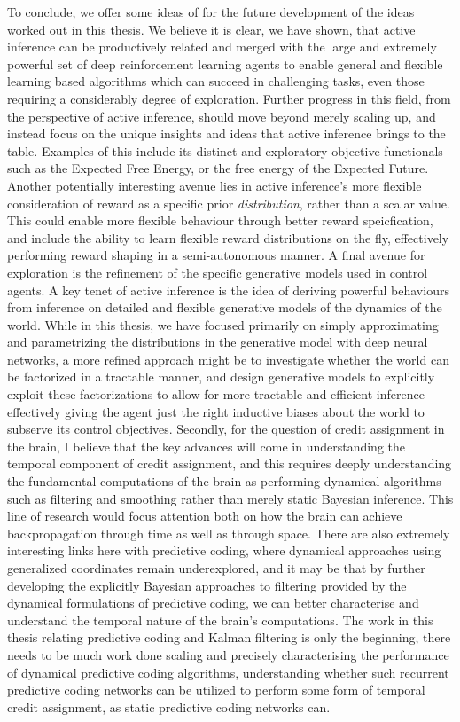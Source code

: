 To conclude, we offer some ideas of for the future development of the ideas worked out in this thesis. We believe it is clear, we have shown, that active inference can be productively related and merged with the large and extremely powerful set of deep reinforcement learning agents to enable general and flexible learning based algorithms which can succeed in challenging tasks, even those requiring a considerably degree of exploration. Further progress in this field, from the perspective of active inference, should move beyond merely scaling up, and instead focus on the unique insights and ideas that active inference brings to the table. Examples of this include its distinct and exploratory objective functionals such as the Expected Free Energy, or the free energy of the Expected Future. Another potentially interesting avenue lies in active inference's more flexible consideration of reward as a specific prior \emph{distribution}, rather than a scalar value. This could enable more flexible behaviour through better reward speicfication, and include the ability to learn flexible reward distributions on the fly, effectively performing reward shaping in a semi-autonomous manner. A final avenue for exploration is the refinement of the specific generative models used in control agents. A key tenet of active inference is the idea of deriving powerful behaviours from inference on detailed and flexible generative models of the dynamics of the world. While in this thesis, we have focused primarily on simply approximating and parametrizing the distributions in the generative model with deep neural networks, a more refined approach might be to investigate whether the world can be factorized in a tractable manner, and design generative models to explicitly exploit these factorizations to allow for more tractable and efficient inference -- effectively giving the agent just the right inductive biases about the world to subserve its control objectives. Secondly, for the question of credit assignment in the brain, I believe that the key advances will come in understanding the temporal component of credit assignment, and this requires deeply understanding the fundamental computations of the brain as performing dynamical algorithms such as filtering and smoothing rather than merely static Bayesian inference. This line of research would focus attention both on how the brain can achieve backpropagation through time as well as through space. There are also extremely interesting links here with predictive coding, where dynamical approaches using generalized coordinates remain underexplored, and it may be that by further developing the explicitly Bayesian approaches to filtering provided by the dynamical formulations of predictive coding, we can better characterise and understand the temporal nature of the brain's computations. The work in this thesis relating predictive coding and Kalman filtering is only the beginning, there needs to be much work done scaling and precisely characterising the performance of dynamical predictive coding algorithms, understanding whether such recurrent predictive coding networks can be utilized to perform some form of temporal credit assignment, as static predictive coding networks can.
